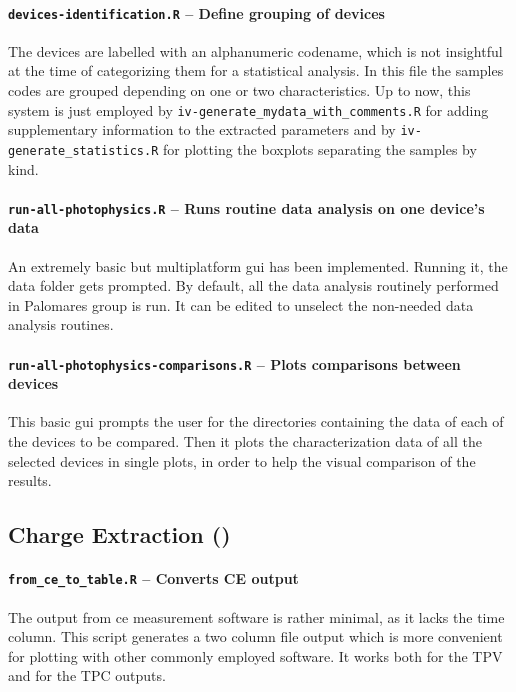 		\paragraph{\texttt{devices-identification.R} -- Define grouping of devices}
		The devices are labelled with an alphanumeric codename, which is not insightful at the time of categorizing them for a statistical analysis.
		In this file the samples codes are grouped depending on one or two characteristics.
		Up to now, this system is just employed by \texttt{iv-generate\_mydata\_with\_comments.R} for adding supplementary information to the extracted parameters and by \texttt{iv-generate\_statistics.R} for plotting the boxplots separating the samples by kind.

		\paragraph{\texttt{run-all-photophysics.R} -- Runs routine data analysis on one device's data}
		An extremely basic but multiplatform \gls{gui} has been implemented.
		Running it, the data folder gets prompted.
		By default, all the data analysis routinely performed in Palomares group is run.
		It can be edited to unselect the non-needed data analysis routines.
		
		\paragraph{\texttt{run-all-photophysics-comparisons.R} -- Plots comparisons between devices}
		This basic \gls{gui} prompts the user for the directories containing the data of each of the devices to be compared.
		Then it plots the characterization data of all the selected devices in single plots, in order to help the visual comparison of the results.
		


	\subsection{Charge Extraction ()}\label{r_ce}

		\paragraph{\texttt{from\_ce\_to\_table.R} -- Converts CE output}
		The output from \gls{ce} measurement software is rather minimal, as it lacks the time column.
		This script generates a two column file output which is more convenient for plotting with other commonly employed software.
		It works both for the TPV and for the TPC outputs.
		
